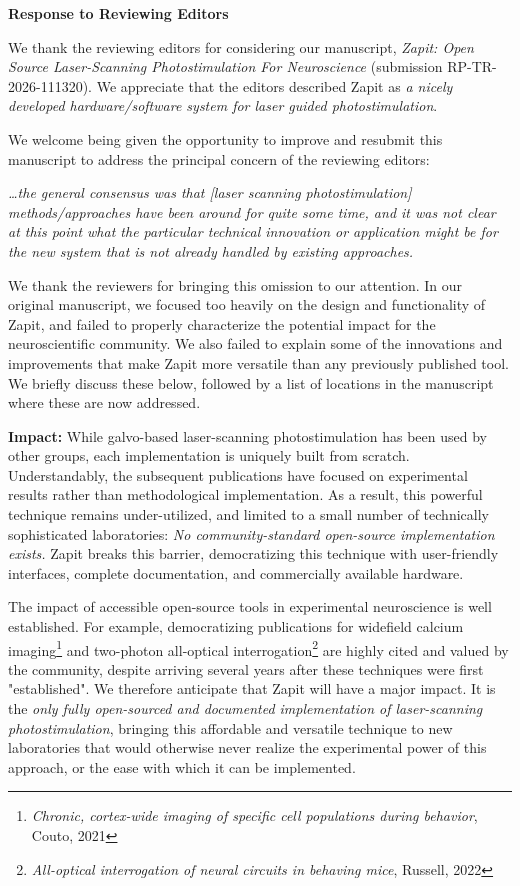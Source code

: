 \documentclass[12pt]{letter}
\date{\today}
\begin{document}
\textbf{Response to Reviewing Editors}


We thank the reviewing editors for considering our manuscript, \textit{Zapit: Open Source Laser-Scanning Photostimulation For Neuroscience} (submission RP-TR-2026-111320). We appreciate that the editors described Zapit as \textit{a nicely developed hardware/software system for laser guided photostimulation}.

We welcome being given the opportunity to improve and resubmit this manuscript to address the principal concern of the reviewing editors:

\textit{\ldots the general consensus was that [laser scanning photostimulation] methods/approaches have been around for quite some time, and it was not clear at this point what the particular technical innovation or application might be for the new system that is not already handled by existing approaches.}

We thank the reviewers for bringing this omission to our attention. In our original manuscript, we focused too heavily on the design and functionality of Zapit, and failed to properly characterize the potential impact for the neuroscientific community. We also failed to explain some of the innovations and improvements that make Zapit more versatile than any previously published tool.  We briefly discuss these below, followed by a list of locations in the manuscript where these are now addressed.

\textbf{Impact:} While galvo-based laser-scanning photostimulation has been used by other groups, each implementation is uniquely built from scratch. Understandably, the subsequent publications have focused on experimental results rather than methodological implementation. As a result, this powerful technique remains under-utilized, and limited to a small number of technically sophisticated laboratories: \textit{No community-standard open-source implementation exists.} Zapit breaks this barrier, democratizing this technique with user-friendly interfaces, complete documentation, and commercially available hardware. 

The impact of accessible open-source tools in experimental neuroscience is well established. For example, democratizing publications for widefield calcium imaging\footnote{\textit{Chronic, cortex-wide imaging of specific cell populations during behavior}, Couto, 2021} and two-photon all-optical interrogation\footnote{\textit{All-optical interrogation of neural circuits in behaving mice}, Russell, 2022} are highly cited and valued by the community, despite arriving several years after these techniques were first "established". We therefore anticipate that Zapit will have a major impact. It is the \textit{only fully open-sourced and documented implementation of laser-scanning photostimulation}, bringing this affordable and versatile technique to new laboratories that would otherwise never realize the experimental power of this approach, or the ease with which it can be implemented.
\end{document}
